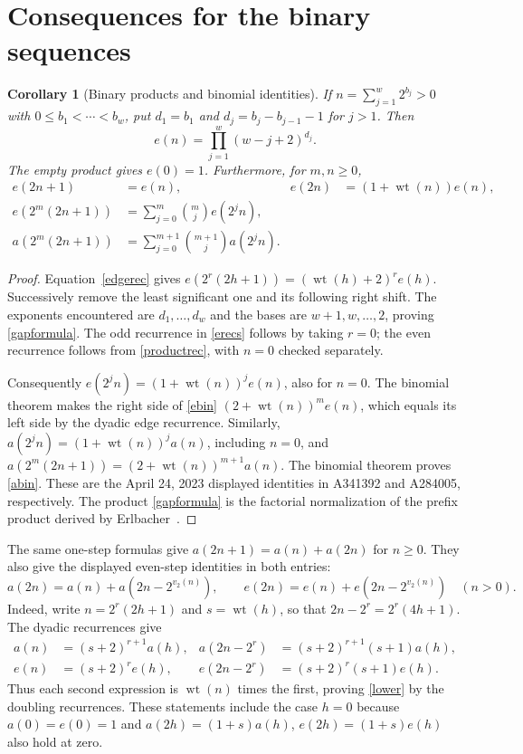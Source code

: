 \documentclass[11pt]{article}
\newcommand{\wt}{\operatorname{wt}}
\newtheorem{corollary}[theorem]{Corollary}
\begin{document}
\section{Consequences for the binary sequences}
\begin{corollary}[Binary products and binomial identities]\label{gaps}
If $n=\sum_{j=1}^{w}2^{b_j}>0$ with $0\leq b_1<\cdots<b_w$, put
$d_1=b_1$ and $d_j=b_j-b_{j-1}-1$ for $j>1$. Then
\begin{equation}\label{gapformula}
 e(n)=\prod_{j=1}^{w}(w-j+2)^{d_j}.
\end{equation}
The empty product gives $e(0)=1$. Furthermore, for $m,n\geq0$,
\begin{align}
 e(2n+1)&=e(n),&e(2n)&=(1+\wt(n))e(n),\label{erecs}\\
 e(2^m(2n+1))&=\sum_{j=0}^{m}\binom mj e(2^j n),\label{ebin}\\
 a(2^m(2n+1))&=\sum_{j=0}^{m+1}\binom{m+1}j a(2^j n).\label{abin}
\end{align}
\end{corollary}
\begin{proof}
Equation~\eqref{edgerec} gives $e(2^r(2h+1))=(\wt(h)+2)^re(h)$.
Successively remove the least significant one and its following right
shift. The exponents encountered are $d_1,\ldots,d_w$ and the bases
are $w+1,w,\ldots,2$, proving \eqref{gapformula}.
The odd recurrence in \eqref{erecs} follows by taking $r=0$;
the even recurrence follows from \eqref{productrec}, with $n=0$
checked separately.

Consequently $e(2^j n)=(1+\wt(n))^je(n)$, also for $n=0$.
The binomial theorem makes the right side of \eqref{ebin}
$(2+\wt(n))^me(n)$, which equals its left side by the dyadic edge
recurrence. Similarly,
$a(2^j n)=(1+\wt(n))^ja(n)$, including $n=0$, and
$a(2^m(2n+1))=(2+\wt(n))^{m+1}a(n)$.
The binomial theorem proves \eqref{abin}. These are the April 24, 2023
displayed identities in A341392 and A284005, respectively.
The product \eqref{gapformula} is the factorial normalization of
the prefix product derived by Erlbacher~\cite[Section 2, (3)--(4)]{erlbacher}.
\end{proof}

The same one-step formulas give $a(2n+1)=a(n)+a(2n)$ for $n\geq0$.
They also give the displayed even-step identities in both entries:
\begin{equation}\label{lower}
 a(2n)=a(n)+a(2n-2^{v_2(n)}),\qquad
 e(2n)=e(n)+e(2n-2^{v_2(n)})\quad(n>0).
\end{equation}
Indeed, write $n=2^r(2h+1)$ and $s=\wt(h)$, so that
$2n-2^r=2^r(4h+1)$. The dyadic recurrences give
\[
\begin{aligned}
 a(n)&=(s+2)^{r+1}a(h),&
 a(2n-2^r)&=(s+2)^{r+1}(s+1)a(h),\\
 e(n)&=(s+2)^re(h),&
 e(2n-2^r)&=(s+2)^r(s+1)e(h).
\end{aligned}
\]
Thus each second expression is $\wt(n)$ times the first, proving
\eqref{lower} by the doubling recurrences. These statements include the
case $h=0$ because $a(0)=e(0)=1$ and $a(2h)=(1+s)a(h)$,
$e(2h)=(1+s)e(h)$ also hold at zero.
\end{document}
